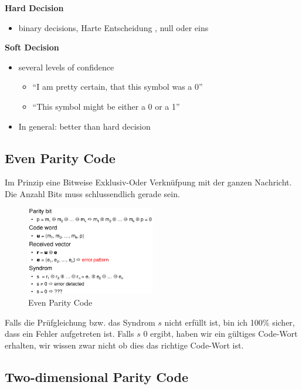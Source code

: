 \textbf{Hard Decision}

\begin{itemize}
\tightlist
\item
  binary decisions, Harte Entscheidung , null oder eins
\end{itemize}

\textbf{Soft Decision}

\begin{itemize}
\tightlist
\item
  several levels of confidence

  \begin{itemize}
  \tightlist
  \item
    ``I am pretty certain, that this symbol was a 0''
  \item
    ``This symbol might be either a 0 or a 1''
  \end{itemize}
\item
  In general: better than hard decision
\end{itemize}

\hypertarget{even-parity-code}{%
\subsection{Even Parity Code}\label{even-parity-code}}

Im Prinzip eine Bitweise Exklusiv-Oder Verknüfpung mit der ganzen
Nachricht. Die Anzahl Bits muss schlussendlich gerade sein.

\begin{figure}[H]
\centering
\includegraphics[width=0.5\textwidth]{figures/parityBit.png}
\caption{Even Parity Code}
\end{figure}

Falls die Prüfgleichung bzw. das Syndrom $s$ nicht erfüllt ist, bin ich
100\% sicher, dass ein Fehler aufgetreten ist. Falls $s$ 0 ergibt, haben
wir ein gültiges Code-Wort erhalten, wir wissen zwar nicht ob dies das
richtige Code-Wort ist.

\hypertarget{two-dimensional-parity-code}{%
\subsection{Two-dimensional Parity
Code}\label{two-dimensional-parity-code}}

